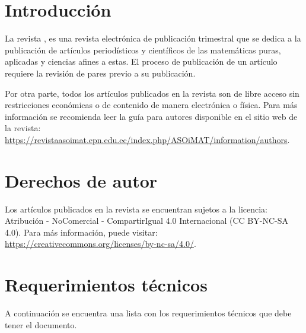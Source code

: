 \documentclass{aleph-revista}
\begin{document}
\membrete
\section{Introducción}
La revista \asoimat{}, es una revista electrónica de publicación trimestral que se dedica a la publicación de artículos periodísticos y científicos de las matemáticas puras, aplicadas y ciencias afines a estas. El proceso de publicación de un artículo requiere la revisión de pares previo a su publicación.

Por otra parte, todos los artículos publicados en la revista \asoimat son de libre acceso sin restricciones económicas o de contenido de manera electrónica o física. Para más información se recomienda leer la guía para autores disponible en el sitio web de la revista: \url{https://revistaasoimat.epn.edu.ec/index.php/ASOiMAT/information/authors}.


\section{Derechos de autor}

Los artículos publicados en la revista \asoimat se encuentran sujetos a la licencia: Atribución - NoComercial - CompartirIgual 4.0 Internacional (CC BY-NC-SA 4.0). Para más información, puede visitar: \url{https://creativecommons.org/licenses/by-nc-sa/4.0/}. 

\section{Requerimientos técnicos}

A continuación se encuentra una lista con los requerimientos técnicos que debe tener el documento.
\end{document}
